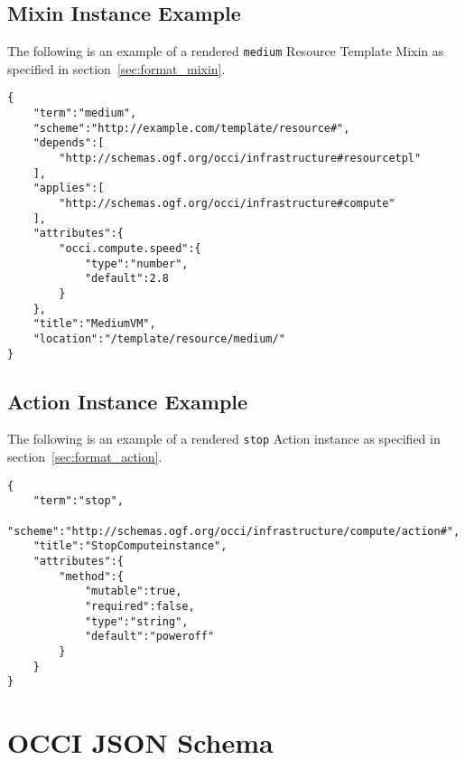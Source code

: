 \documentclass[10pt,a4paper]{article}
\begin{document}
\begin{appendices}
\subsection{Mixin Instance Example}
\label{mixin_instance_rendering_example}

The following is an example of a rendered \texttt{medium} Resource Template Mixin as specified in section~\ref{sec:format_mixin}.

\begin{lstlisting}
{
    "term":"medium",
    "scheme":"http://example.com/template/resource#",
    "depends":[
        "http://schemas.ogf.org/occi/infrastructure#resourcetpl"
    ],
    "applies":[
        "http://schemas.ogf.org/occi/infrastructure#compute"
    ],
    "attributes":{
        "occi.compute.speed":{
            "type":"number",
            "default":2.8
        }
    },
    "title":"MediumVM",
    "location":"/template/resource/medium/"
}
\end{lstlisting}


\subsection{Action Instance Example}
\label{action_instance_rendering_example}

The following is an example of a rendered \texttt{stop} Action instance as specified in section~\ref{sec:format_action}.

\begin{lstlisting}
{
    "term":"stop",
    "scheme":"http://schemas.ogf.org/occi/infrastructure/compute/action#",
    "title":"StopComputeinstance",
    "attributes":{
        "method":{
            "mutable":true,
            "required":false,
            "type":"string",
            "default":"poweroff"
        }
    }
}
\end{lstlisting}


\section{OCCI JSON Schema}


\end{appendices}
\end{document}
